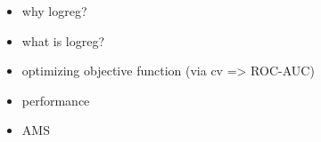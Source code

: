 \begin{itemize}
	\item why logreg?
	\item what is logreg?
	\item optimizing objective function (via cv => ROC-AUC)
	\item performance
	\item AMS
\end{itemize}